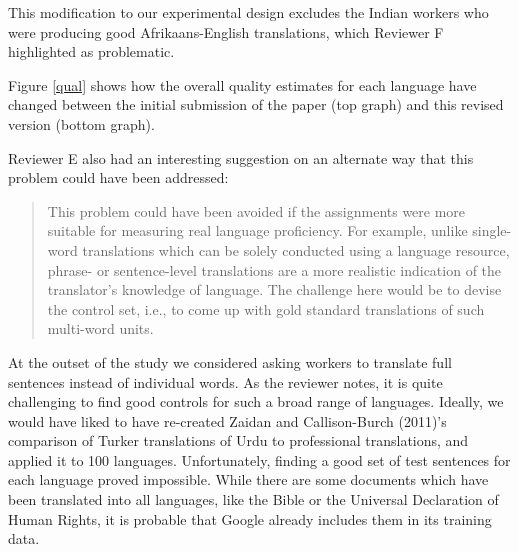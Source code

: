 \documentclass[11pt]{article}
\begin{document}
This modification to our experimental design excludes the Indian workers who were producing good Afrikaans-English translations, which Reviewer F highlighted as problematic.  

Figure \ref{qual} shows how the overall quality estimates for each language have changed between the initial submission of the paper (top graph) and this revised version (bottom graph).


Reviewer E also had an interesting suggestion on an alternate way that this problem could have been addressed:
\begin{quote}
This problem could have been avoided if the assignments were more suitable
for measuring real language proficiency. For example, unlike single-word
translations which can be solely conducted using a language resource,
phrase- or sentence-level translations are a more realistic indication of
the translator's knowledge of language. The challenge here would be to
devise the control set, i.e., to come up with gold standard translations of
such multi-word units. 
\end{quote}
At the outset of the study we considered asking workers to translate full sentences instead of individual words.  As the reviewer notes, it is quite challenging to find good controls for such a broad range of languages.  Ideally, we would have liked to have re-created Zaidan and Callison-Burch (2011)'s comparison of Turker translations of Urdu to professional translations, and applied it to 100 languages.   Unfortunately, finding a good set of test sentences for each language proved impossible.  While there are some documents which have been translated into all languages, like the Bible or the Universal Declaration of Human Rights, it is probable that Google already includes them in its training data. 
\end{document}
